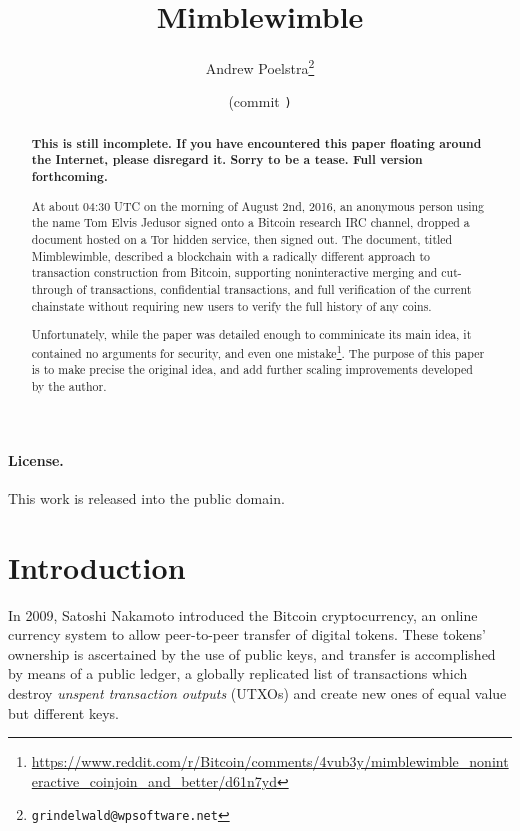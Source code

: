 \documentclass[letterpaper]{article}
\title{Mimblewimble}
\author{Andrew Poelstra\footnote{\texttt{grindelwald@wpsoftware.net}}}
\date{\gitAuthorDate{} (commit \texttt{\gitAbbrevHash)}}
\begin{document}
\maketitle

\begin{abstract} 
\textbf{This is still incomplete. If you have encountered this paper floating
around the Internet, please disregard it. Sorry to be a tease. Full version
forthcoming.}

At about 04:30 UTC on the morning of August 2nd, 2016, an anonymous person
using the name Tom Elvis Jedusor signed onto a Bitcoin research IRC channel,
dropped a document hosted on a Tor hidden service\cite{voldemort2016}, then signed out. The
document, titled Mimblewimble, described a blockchain with a radically
different approach to transaction construction from Bitcoin, supporting
noninteractive merging and cut-through of transactions, confidential
transactions, and full verification of the current chainstate without
requiring new users to verify the full history of any coins.

Unfortunately, while the paper was detailed enough to comminicate its main
idea, it contained no arguments for security, and even one mistake\footnote{\url{https://www.reddit.com/r/Bitcoin/comments/4vub3y/mimblewimble_noninteractive_coinjoin_and_better/d61n7yd}}.
The purpose of this paper is to make precise the original idea, and add
further scaling improvements developed by the author.
\end{abstract}

\paragraph{License.} This work is released into the public domain.

\clearpage
\tableofcontents

\modulolinenumbers[10]
\linenumbers

\section{Introduction}

In 2009, Satoshi Nakamoto introduced the Bitcoin cryptocurrency\cite{nakamoto2009},
an online currency system to allow peer-to-peer transfer of digital tokens.
These tokens' ownership is ascertained by the use of public keys, and transfer
is accomplished by means of a public ledger, a globally replicated list of
transactions which destroy \emph{unspent transaction outputs} (UTXOs) and
create new ones of equal value but different keys.
\end{document}
